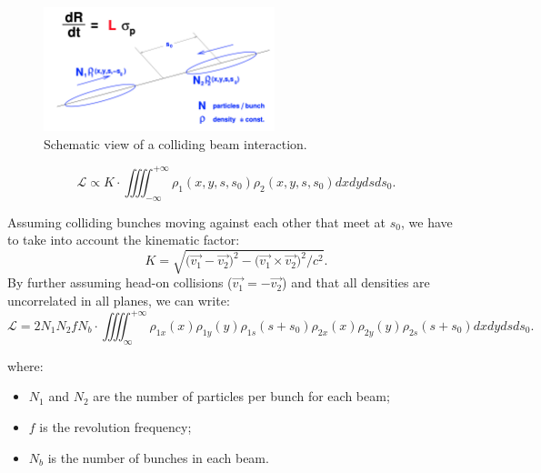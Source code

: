 \begin{figure}
    \centering
    \includegraphics[width=0.6\textwidth]{figures/luminosity_def.png}
    \caption{Schematic view of a colliding beam interaction.}
    \label{fig:lumi-def}
\end{figure}

\begin{equation}
    \mathcal{L} \propto K\cdot\iiiint_{-\infty}^{+\infty}\rho_1(x,y,s,s_0)\rho_2(x,y,s,s_0)dxdydsds_0.\label{lumi_propto}
\end{equation}

Assuming colliding bunches moving against each other that meet at $s_0$, we have to take into account the kinematic factor\cite{Moller}:
\begin{equation}
    K = \sqrt{\bigl(\vec{v_1}-\vec{v_2}\bigr)^2-\bigl(\vec{v_1} \times \vec{v_2}\bigr)^2/c^2}.
\end{equation}
By further assuming head-on collisions ($\vec{v_1}=-\vec{v_2}$) and that all densities are uncorrelated in all planes, we can write:
\begin{equation}
        \mathcal{L} = 2 N_1 N_2 f N_b\cdot\iiiint_{\infty}^{+\infty}\rho_{1x}(x)\rho_{1y}(y)\rho_{1s}(s+s_0)\rho_{2x}(x)\rho_{2y}(y)\rho_{2s}(s+s_0)dxdydsds_0.\label{beam_overlap}
\end{equation}

where:
\begin{itemize}
    \item \( N_1 \) and \( N_2 \) are the number of particles per bunch for each beam;
    \item \( f \) is the revolution frequency;
    \item \( N_b \) is the number of bunches in each beam.
\end{itemize}

